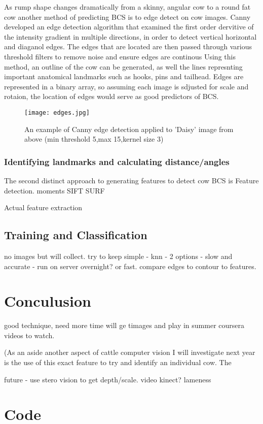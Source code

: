 \documentclass[11pt]{article}
\begin{document}
	As rump shape changes dramatically from a skinny, angular cow to a round fat cow another method of predicting BCS is to edge detect on cow images.
	Canny developed an edge detection algorithm that examined the first order dervitive of the intensity gradient in multiple directions, in order to detect vertical horizontal and diaganol edges\cite{Canny1986}.
	The edges that are located are then passed through various threshold filters to remove noise and ensure edges are continous
	Using this method, an outline of the cow can be generated, as well the lines represnting important anatomical landmarks such as hooks, pins and tailhead.
	Edges are represented in a binary array, so assuming each image is sdjusted for scale and rotaion, the location of edges would serve as good predictors of BCS.

	\begin{figure}[h!]
		\centering
		\texttt{[image: edges.jpg]}
		\caption{An example of Canny edge detection applied to 'Daisy' image from above (min threshold 5,max 15,kernel size 3) }
		\label{fig:<+label+>}
	\end{figure}

	\subsubsection{Identifying landmarks and calculating distance/angles}

	The second distinct approach to generating features to detect cow BCS is Feature detection.
	moments
	SIFT
	SURF

	Actual feature extraction


\subsection{Training and Classification}
	no images but will collect. 
	try to keep simple - knn -  2 options - slow and accurate - run on server overnight? or fast.
	compare edges to contour to features.

\section{Conculusion}
	good technique, need more time
	will ge timages and play in summer
	coursera videos to watch.

	(As an aside another aspect of cattle computer vision I will investigate next year is the use of this exact feature to try and identify an individual cow. The 

	future - use stero vision to get depth/scale.
		video
		kinect?
		lameness

\section{Code}
		



\end{document}
